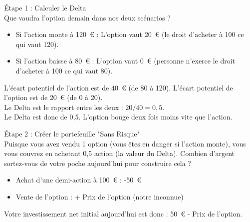 \begin{intuitionbox}
Étape 1 : Calculer le Delta\\
Que vaudra l'option demain dans nos deux scénarios ?
\begin{itemize}[label=$\rightarrow$]
    \item Si l'action monte à 120~€ : L'option vaut 20~€ (le droit d'acheter à 100 ce qui vaut 120).
    \item Si l'action baisse à 80~€ : L'option vaut 0~€ (personne n'exerce le droit d'acheter à 100 ce qui vaut 80).
\end{itemize}
L'écart potentiel de l'action est de 40~€ (de 80 à 120). L'écart potentiel de l'option est de 20~€ (de 0 à 20). \\
Le Delta est le rapport entre les deux : $20 / 40 = 0,5$. \\
Le Delta est donc de 0,5. L'option bouge deux fois moins vite que l'action.

\vspace{0.4cm}
Étape 2 : Créer le portefeuille "Sans Risque"\\
Puisque vous avez vendu 1 option (vous êtes en danger si l'action monte), vous vous couvrez en achetant 0,5 action (la valeur du Delta).
Combien d'argent sortez-vous de votre poche aujourd'hui pour construire cela ?
\begin{itemize}[label=$\rightarrow$]
    \item Achat d'une demi-action à 100~€ : -50~€
    \item Vente de l'option : + Prix de l'option (notre inconnue)
\end{itemize}
Votre investissement net initial aujourd'hui est donc : 50~€ - Prix de l'option.


\end{intuitionbox}

